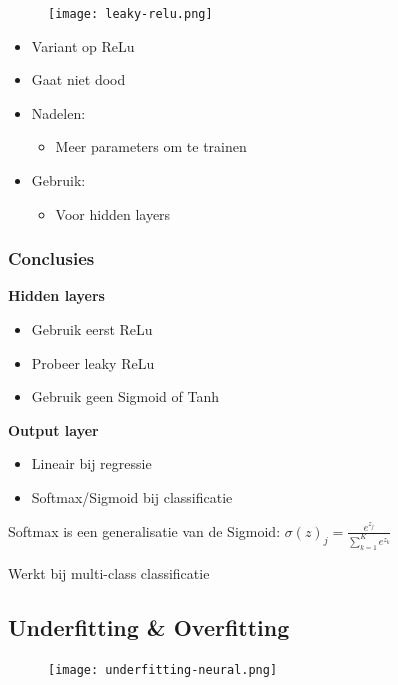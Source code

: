 \documentclass{article}
\begin{document}
\begin{figure}[H]
    \centering
    \texttt{[image: leaky-relu.png]}
\end{figure}


\begin{itemize}
    \item Variant op ReLu
    \item Gaat niet dood
    \item Nadelen:
    \begin{itemize}
        \item Meer parameters om te trainen
    \end{itemize}
    \item Gebruik:
    \begin{itemize}
        \item Voor hidden layers
    \end{itemize}
\end{itemize}

\subsubsection{Conclusies}

\textbf{Hidden layers}

\begin{itemize}
    \item Gebruik eerst ReLu
    \item Probeer leaky ReLu
    \item Gebruik geen Sigmoid of Tanh
\end{itemize}

\textbf{Output layer}

\begin{itemize}
    \item Lineair bij regressie
    \item Softmax/Sigmoid bij classificatie
\end{itemize}

Softmax is een generalisatie van de Sigmoid: $\sigma(z)_j = \frac{e^{z_j}}{\sum_{k=1}^K e^{z_k}}$

Werkt bij multi-class classificatie

\subsection{Underfitting \& Overfitting}

\begin{figure}[H]
    \centering
    \texttt{[image: underfitting-neural.png]}
\end{figure}
\end{document}
